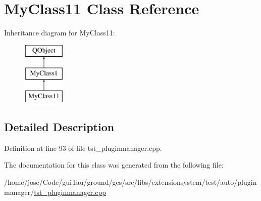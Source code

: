 \hypertarget{class_my_class11}{\section{My\-Class11 Class Reference}
\label{class_my_class11}
}
Inheritance diagram for My\-Class11\-:\begin{figure}[H]
\begin{center}
\leavevmode
\includegraphics[height=3.000000cm]{class_my_class11}
\end{center}
\end{figure}


\subsection{Detailed Description}


Definition at line 93 of file tst\-\_\-pluginmanager.\-cpp.



The documentation for this class was generated from the following file\-:\begin{DoxyCompactItemize}
\item 
/home/jose/\-Code/gui\-Tau/ground/gcs/src/libs/extensionsystem/test/auto/pluginmanager/\hyperlink{tst__pluginmanager_8cpp}{tst\-\_\-pluginmanager.\-cpp}\end{DoxyCompactItemize}
